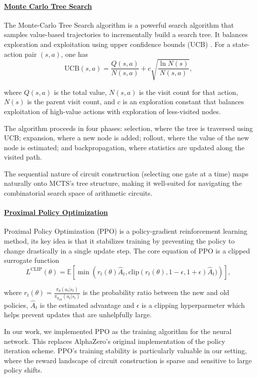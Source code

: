 \documentclass{article} %
\begin{document}
\paragraph{\underline{Monte Carlo Tree Search}}

The Monte-Carlo Tree Search algorithm is a powerful search algorithm that samples value-based trajectories to incrementally build a search tree. It balances exploration and exploitation using upper confidence bounds (UCB)  \citep{KocsisBanditMonteCarlo}. For a state-action pair $(s,a)$, one has $$\text{UCB}(s, a) = \frac{Q(s, a)}{N(s, a)} + c \sqrt{\frac{\ln N(s)}{N(s, a)}},$$

where $Q(s, a)$ is the total value, $N(s, a)$ is the visit count for that action, $N(s)$ is the parent visit count, and $c$ is an exploration constant that balances exploitation of high-value actions with exploration of less-visited nodes.

The algorithm proceeds in four phases: selection, where the tree is traversed using UCB; expansion, where a new node is added; rollout, where the value of the new node is estimated; and backpropagation, where statistics are updated along the visited path.

The sequential nature of circuit construction (selecting one gate at a time) maps naturally onto MCTS's tree structure, making it well-suited for navigating the combinatorial search space of arithmetic circuits.

\paragraph{\underline{Proximal Policy Optimization}}

Proximal Policy Optimization (PPO) is a policy-gradient reinforcement learning method, its key idea is that it stabilizes training by preventing the policy to change drastically in a single update step. The core equation of PPO is a clipped surrogate function \citep{schulman2017ppo} $$L^{\text{CLIP}}(\theta) = \mathbb{E}\left[ \min\left(r_t(\theta)\hat{A}_t, \text{clip}(r_t (\theta), 1 - \epsilon, 1 + \epsilon)\hat{A}_t)\right) \right],$$

where $r_t(\theta) = \frac{\pi_\theta(a_t|s_t)}{\pi_{\theta_{\text{old}}}(a_t|s_t)}$ is the probability ratio between the new and old policies, $\hat{A}_t$ is the estimated advantage and $\epsilon$ is a clipping hyperparmeter which helps prevent updates that are unhelpfully large.

In our work, we implemented PPO as the training algorithm for the neural network. This replaces AlphaZero's original implementation of the policy iteration scheme. PPO's training stability is particularly valuable in our setting, where the reward landscape of circuit construction is sparse and sensitive to large policy shifts.
\end{document}
